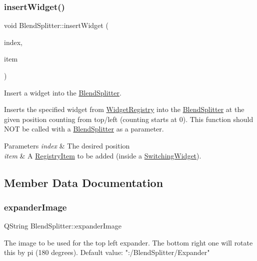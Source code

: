\subsubsection{\texorpdfstring{insert\+Widget()}{insertWidget()}\hspace{0.1cm}{\footnotesize\ttfamily [3/3]}}
{\footnotesize\ttfamily void Blend\+Splitter\+::insert\+Widget (\begin{DoxyParamCaption}\item[{int}]{index,  }\item[{\hyperlink{class_registry_item}{Registry\+Item} $\ast$}]{item }\end{DoxyParamCaption})}



Insert a widget into the \hyperlink{class_blend_splitter}{Blend\+Splitter}. 

Inserts the specified widget from \hyperlink{class_widget_registry}{Widget\+Registry} into the \hyperlink{class_blend_splitter}{Blend\+Splitter} at the given position counting from top/left (counting starts at 0). This function should N\+OT be called with a \hyperlink{class_blend_splitter}{Blend\+Splitter} as a parameter. 
\begin{DoxyParams}{Parameters}
{\em index} & The desired position \\
\hline
{\em item} & A \hyperlink{class_registry_item}{Registry\+Item} to be added (inside a \hyperlink{class_switching_widget}{Switching\+Widget}). \\
\hline
\end{DoxyParams}


\subsection{Member Data Documentation}
\hypertarget{class_blend_splitter_a38c7ab0fb471718aca5eb3fe09aa124b}{}\label{class_blend_splitter_a38c7ab0fb471718aca5eb3fe09aa124b} 
\subsubsection{\texorpdfstring{expander\+Image}{expanderImage}}
{\footnotesize\ttfamily Q\+String Blend\+Splitter\+::expander\+Image\hspace{0.3cm}{\ttfamily [static]}}

The image to be used for the top left expander. The bottom right one will rotate this by pi (180 degrees). Default value\+: "\+:/\+Blend\+Splitter/\+Expander" 

